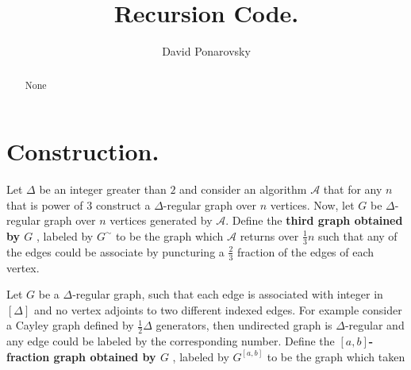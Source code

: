 \documentclass{article}
\begin{document}
\title{Recursion Code.} 
\author{David Ponarovsky}
\maketitle
\begin{abstract}None 
\end{abstract}

\section{Construction.}
\begin{definition} 
  Let $\Delta$ be an integer greater than $2$ and consider an algorithm $\mathcal{A}$ that for any $n$ that is power of $3$ construct a $\Delta$-regular graph over $n$ vertices. Now, let $G$ be $\Delta$-regular graph over $n$ vertices generated by $\mathcal{A}$. Define the \textbf{third graph obtained by $G$ } , labeled by $G^{\sim}$ to be the graph which $\mathcal{A}$ returns over $\frac{1}{3} n$ such that any of the edges could be associate by puncturing a $\frac{2}{3}$ fraction of the edges of each vertex.  
\end{definition}

\begin{definition}
  Let $G$ be a $\Delta$-regular graph, such that each edge is associated with integer in $[\Delta]$ and no vertex adjoints to two different indexed edges. For example consider a Cayley graph defined by $\frac{1}{2}\Delta$ generators, then undirected graph is $\Delta$-regular and any edge could be labeled by the corresponding number. Define the \textbf{$[a,b]$-fraction graph obtained by $G$ } , labeled by $G^{[a,b]}$ to be the graph which taken 
\end{definition}
\end{document}
